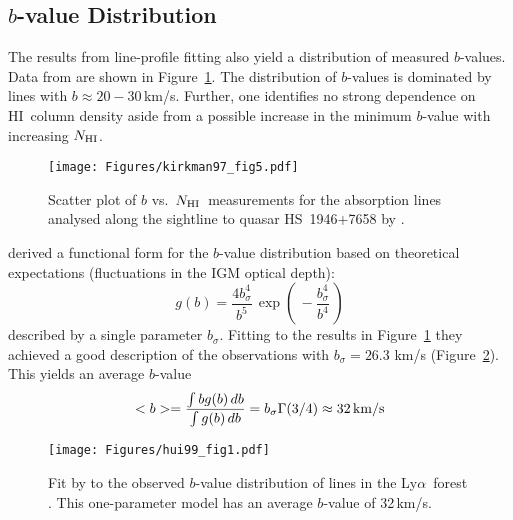 \documentclass[graybox]{svmult}
\newcommand{\HI}{H{\sc I}}
\def\lya{Ly$\alpha$}
\def\ltp{\left ( \,}
\def\rtp{\, \right  ) }
\newcommand{\mnhi}{N_{\rm HI}}
\newcommand{\nhi}{$\mnhi$}
\begin{document}
\subsection{$b$-value Distribution}

The results from  line-profile fitting also yield 
a distribution of measured $b$-values.
Data from \cite{kt97} are shown in 
Figure~\ref{fig:kt97_bN_scatter}. 
The distribution of $b$-values is dominated by lines with
$b \approx 20-30$\,km/s.
Further, one identifies
no strong dependence on \HI\ column density aside from
a possible increase in the minimum $b$-value with increasing \nhi.

%
\begin{figure}[b]
\sidecaption
\texttt{[image: Figures/kirkman97\_fig5.pdf]}
%
%
\caption{Scatter plot of $b$ vs.\ \nhi\ measurements for
the absorption lines analysed along the sightline
to quasar HS~1946+7658 by \cite{kt97}.
}
\label{fig:kt97_bN_scatter}       %
\end{figure}

\cite{hr99} derived a functional form for the $b$-value
distribution based on theoretical expectations (fluctuations
in the IGM optical depth):
\begin{equation}
g(b) = \frac{4 b_\sigma^4}{b^5} \, \exp \ltp - \frac{b_\sigma^4}{b^4} \rtp
\end{equation}
described by a single parameter $b_\sigma$.
Fitting to the results in Figure~\ref{fig:kt97_bN_scatter}
they achieved a 
good description of the observations with $b_\sigma = 26.3$ km/s
(Figure~\ref{fig:hui99_fig1}).
This yields an average $b$-value
\begin{equation}
<b> = \frac{\int b g(b) \, db}{\int g(b) \, db} = b_\sigma \Gamma(3/4)
\approx 32 \, {\rm km/s}
\end{equation}

%
\begin{figure}[b]
\sidecaption
\texttt{[image: Figures/hui99\_fig1.pdf]}
%
%
\caption{Fit by \cite{hr99} to the observed $b$-value distribution of
lines in the \lya\ forest \cite{kt97}.  This one-parameter
model has an average $b$-value of 32\,km/s.
}
\label{fig:hui99_fig1}       %
\end{figure}
\end{document}

